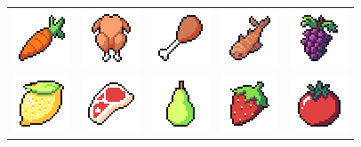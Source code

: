 \documentclass[../Main.tex]{subfiles}
\begin{document}
\begin{center}
\begin{tabular}{ m{} m{} m{} m{} m{} }
                    \centerline{\includegraphics{../res/textures/items/potions/food/Carrot.png}} & \centerline{\includegraphics{../res/textures/items/potions/food/Chicken.png}} & \centerline{\includegraphics{../res/textures/items/potions/food/ChickenLeg.png}} & \centerline{\includegraphics{../res/textures/items/potions/food/Fish.png}} & \centerline{\includegraphics{../res/textures/items/potions/food/Grapes.png}} \\
                    \centerline{\includegraphics{../res/textures/items/potions/food/Lemon.png}} & \centerline{\includegraphics{../res/textures/items/potions/food/Meat.png}} & \centerline{\includegraphics{../res/textures/items/potions/food/Pear.png}} & \centerline{\includegraphics{../res/textures/items/potions/food/Strawberry.png}} & \centerline{\includegraphics{../res/textures/items/potions/food/Tomato.png}} \\

\end{tabular}
\end{center}
\end{document}
